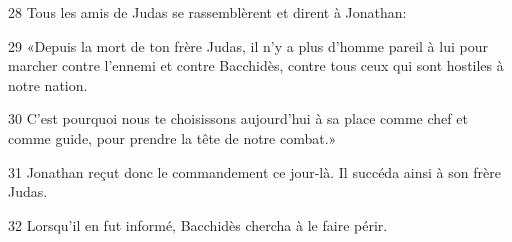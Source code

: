 28 Tous les amis de Judas se rassemblèrent et dirent à Jonathan:

29 «Depuis la mort de ton frère Judas, il n’y a plus d’homme pareil à lui pour marcher contre l’ennemi et contre Bacchidès, contre tous ceux qui sont hostiles à notre nation.

30 C’est pourquoi nous te choisissons aujourd’hui à sa place comme chef et comme guide, pour prendre la tête de notre combat.»

31 Jonathan reçut donc le commandement ce jour-là. Il succéda ainsi à son frère Judas.

32 Lorsqu’il en fut informé, Bacchidès chercha à le faire périr.
